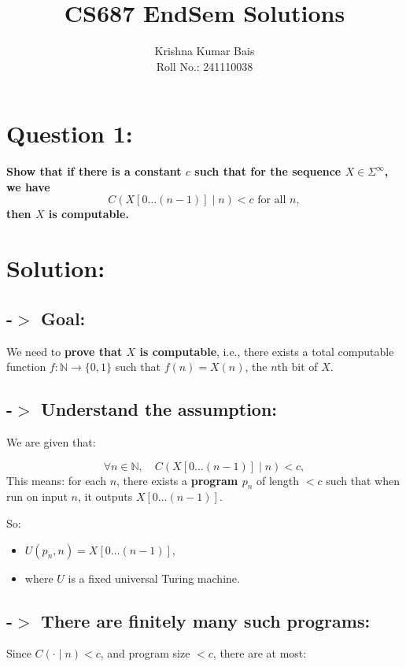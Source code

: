 \documentclass[12pt]{article}
\title{\textbf{CS687 EndSem Solutions}}
\author{Krishna Kumar Bais\\Roll No.: 241110038}
\date{}
\begin{document}
\maketitle

\section*{Question 1:}

\textbf{Show that if there is a constant \( c \) such that for the sequence \( X \in \Sigma^\infty \), we have}
\[
C(X[0\ldots(n-1)] \mid n) < c \text{ for all } n,
\]
\textbf{then \( X \) is computable.}


\section*{Solution:}
\subsection*{-$>$ Goal:}  
We need to \textbf{prove that \( X \) is computable}, i.e., there exists a total computable function \( f : \mathbb{N} \to \{0,1\} \) such that \( f(n) = X(n) \), the \( n \)th bit of \( X \).

\subsection*{-$>$ Understand the assumption:}

   We are given that:

\[
\forall n \in \mathbb{N}, \quad C(X[0\ldots(n-1)] \mid n) < c,
\]
\newline
This means: for each \( n \), there exists a \textbf{program \( p_n \)} of length \( < c \) such that when run on input \( n \), it outputs \( X[0\ldots(n-1)] \).

So:
\begin{itemize}
  \item \( U(p_n, n) = X[0\ldots(n-1)] \),
  \item where \( U \) is a fixed universal Turing machine.
\end{itemize}

\subsection*{-$>$ There are finitely many such programs:}

Since \( C(\cdot \mid n) < c \), and program size \( < c \), there are at most:
\end{document}
